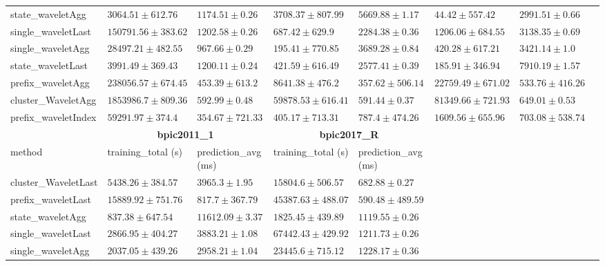 \documentclass[twoside,11pt]{Latex/Classes/PhDthesisPSnPDF}
\begin{document}
\begin{table}[h]
{\begin{tabular}{llllllll}
				state\_waveletAgg & $\mathbf{3064.51 \pm 612.76}$ & $1174.51 \pm 0.26$ & $3708.37 \pm 807.99$ & $5669.88 \pm 1.17$ & $\mathbf{44.42 \pm 557.42}$ & $2991.51 \pm 0.66$ \\ 
				single\_waveletLast & $150791.56 \pm 383.62$ & $1202.58 \pm 0.26$ & $687.42 \pm 629.9$ & $2284.38 \pm 0.36$ & $1206.06 \pm 684.55$ & $3138.35 \pm 0.69$ \\ 
				single\_waveletAgg & $28497.21 \pm 482.55$ & $967.66 \pm 0.29$ & $\mathbf{195.41 \pm 770.85}$ & $3689.28 \pm 0.84$ & $420.28 \pm 617.21$ & $3421.14 \pm 1.0$ \\ 
				state\_waveletLast & $3991.49 \pm 369.43$ & $1200.11 \pm 0.24$ & $421.59 \pm 616.49$ & $2577.41 \pm 0.39$ & $185.91 \pm 346.94$ & $7910.19 \pm 1.57$ \\ 
				prefix\_waveletAgg & $238056.57 \pm 674.45$ & $453.39 \pm 613.2$ & $8641.38 \pm 476.2$ & $\mathbf{357.62 \pm 506.14}$ & $22759.49 \pm 671.02$ & $\mathbf{533.76 \pm 416.26}$ \\ 
				cluster\_WaveletAgg & $1853986.7 \pm 809.36$ & $592.99 \pm 0.48$ & $59878.53 \pm 616.41$ & $591.44 \pm 0.37$ & $81349.66 \pm 721.93$ & $649.01 \pm 0.53$ \\ 
				prefix\_waveletIndex & $59291.97 \pm 374.4$ & $\mathbf{354.67 \pm 721.33}$ & $405.17 \pm 713.31$ & $787.4 \pm 474.26$ & $1609.56 \pm 655.96$ & $703.08 \pm 538.74$ \\ 
				\bottomrule
				\toprule
				& \multicolumn{2}{c}{{\bfseries bpic2011\_1}} & \multicolumn{2}{c}{{\bfseries bpic2017\_R}} \\ \cmidrule(lr){2-3} \cmidrule(lr){4-5} \cmidrule(lr){6-7}
				method  & training\_total (s) & prediction\_avg (ms) & training\_total (s) & prediction\_avg (ms) \\ \midrule
				cluster\_WaveletLast & $5438.26 \pm 384.57$ & $3965.3 \pm 1.95$ & $15804.6 \pm 506.57$ & $682.88 \pm 0.27$ \\ 
				prefix\_waveletLast & $15889.92 \pm 751.76$ & $817.7 \pm 367.79$ & $45387.63 \pm 488.07$ & $590.48 \pm 489.59$ \\ 
				state\_waveletAgg & $837.38 \pm 647.54$ & $11612.09 \pm 3.37$ & $\mathbf{1825.45 \pm 439.89}$ & $1119.55 \pm 0.26$ \\ 
				single\_waveletLast & $2866.95 \pm 404.27$ & $3883.21 \pm 1.08$ & $67442.43 \pm 429.92$ & $1211.73 \pm 0.26$ \\ 
				single\_waveletAgg & $2037.05 \pm 439.26$ & $2958.21 \pm 1.04$ & $23445.6 \pm 715.12$ & $1228.17 \pm 0.36$ \\ 

\end{tabular}}
\end{table}
\end{document}
